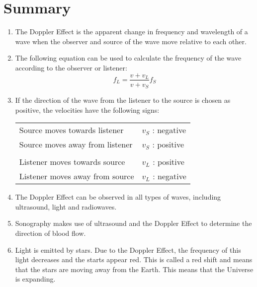 \section{Summary}
\begin{enumerate}
\item 
{The Doppler Effect is the apparent change in frequency and wavelength of a wave when the observer and source of the wave move relative to each other.}
\item {The following equation can be used to calculate the frequency of the wave according to the observer or listener:
$$f_L=\frac{v + v_L}{v + v_S}f_S$$
}
\item  {
If the direction of the wave from the listener to the source is chosen as positive, the velocities have the following signs:
\begin{center}
\begin{tabular}{|ll|}
\hline
Source moves towards listener & $v_S$ : negative\\
Source moves away from listener & $v_S$ : positive\\
    &   \\
Listener moves towards source & $v_L$ : positive\\
Listener moves away from source & $v_L$ : negative\\
\hline
\end{tabular}
\end{center}
}
\item{The Doppler Effect can be observed in all types of waves, including ultrasound, light and radiowaves.}
\item{Sonography makes use of ultrasound and the Doppler Effect to determine the direction of blood flow.}
\item{Light is emitted by stars. Due to the Doppler Effect, the frequency of this light decreases and the starts appear red. This is called a red shift and means that the stars are moving away from the Earth. This means that the Universe is expanding.}
\end{enumerate}

